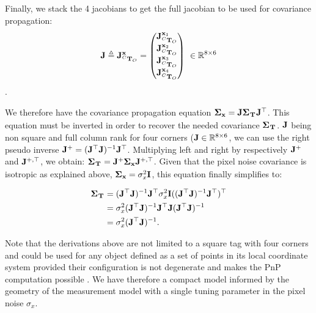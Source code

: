 Finally, we stack the 4 jacobians to get the full jacobian to be used for covariance propagation:
%
\begin{equation}
    {\bf J} \triangleq {\bf J}^{{\bf x}}_{\prescript{C}{}{{\bf T}}_{O}}=
    \begin{pmatrix}
    {\bf J}^{{\bf x}_1}_{\prescript{C}{}{{\bf T}}_{O}} \\ 
    {\bf J}^{{\bf x}_2}_{\prescript{C}{}{{\bf T}}_{O}} \\ 
    {\bf J}^{{\bf x}_3}_{\prescript{C}{}{{\bf T}}_{O}} \\ 
    {\bf J}^{{\bf x}_4}_{\prescript{C}{}{{\bf T}}_{O}}
    \end{pmatrix}
    ~ \in \mathbb{R}^{8 \times 6}
\end{equation}.

We therefore have the covariance propagation equation ${\bm \Sigma}_{{\bf x}} = {\bf J} {\bm \Sigma}_{\prescript{}{}{{\bf T}}_{}} {\bf J}^{\top}$. 
This equation must be inverted in order to recover the needed covariance ${\bm \Sigma}_{\prescript{}{}{{\bf T}}_{}}$. ${\bf J}$ being non square and full column rank for four 
corners (${\bf J} \in \mathbb{R}^{8 \times 6}$, we can use the right pseudo inverse ${\bf J}^{+} = ({\bf J}^{\top} {\bf J})^{-1}{\bf J}^{\top}$. Multiplying left and right by 
respectively ${\bf J}^{+}$ and ${\bf J}^{+,\top}$, we obtain: ${\bm \Sigma}_{\prescript{}{}{{\bf T}}_{}} = {\bf J}^{+} {\bm \Sigma}_{{\bf x}} {\bf J}^{+,\top}$. Given that the pixel noise covariance is 
isotropic as explained above, ${\bm \Sigma}_{{\bf x}} = \sigma_x^2 {\bf I}$, this equation finally simplifies to:

\begin{align}
    {\bm \Sigma}_{\prescript{}{}{{\bf T}}_{}} 
    &=  ({\bf J}^{\top} {\bf J})^{-1}{\bf J} ^{\top} \sigma_x^2 {\bf I} (({\bf J}^{\top} {\bf J})^{-1}{\bf J}^{\top})^{\top} \\
    &=  \sigma_x^2 ({\bf J}^{\top} {\bf J})^{-1} {\bf J}^{\top} {\bf J} ({\bf J}^{\top} {\bf J})^{-1} \\
    &= \sigma_{x}^2({\bf J}^{\top} {\bf J})^{-1}.
\end{align}

Note that the derivations above are not limited to a square tag with four corners and could be used for any object defined as
a set of points in its local coordinate system provided their configuration is not degenerate and makes the PnP computation possible \cite{gao2003complete}.  
We have therefore a compact model informed by the geometry of the measurement model with a single tuning parameter in the pixel noise $\sigma_x$.



